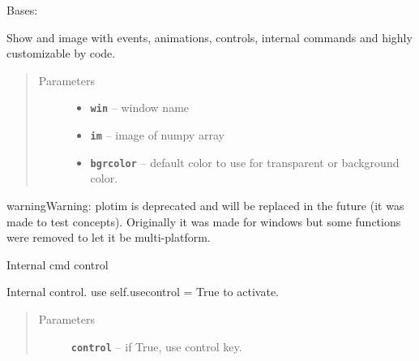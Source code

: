 \documentclass[letterpaper,10pt,english]{sphinxmanual}
\begin{document}
\begin{fulllineitems}
\label{RRtoolbox.lib:RRtoolbox.lib.plotter.plotim}
Bases: 

Show and image with events, animations, controls, internal
commands and highly customizable by code.
\begin{quote}\begin{description}
\item[{Parameters}] \leavevmode\begin{itemize}
\item {} 
\textbf{\texttt{win}} -- window name

\item {} 
\textbf{\texttt{im}} -- image of numpy array

\item {} 
\textbf{\texttt{bgrcolor}} -- default color to use for transparent or background color.

\end{itemize}

\end{description}\end{quote}

\begin{notice}{warning}{Warning:}
plotim is deprecated and will be replaced in the future (it was made to
test concepts). Originally it was made for windows but some functions
were removed to let it be multi-platform.
\end{notice}

\begin{fulllineitems}
\label{RRtoolbox.lib:RRtoolbox.lib.plotter.plotim.builtincmd}
Internal cmd control

\end{fulllineitems}


\begin{fulllineitems}
\label{RRtoolbox.lib:RRtoolbox.lib.plotter.plotim.builtincontrol}
Internal control. use self.usecontrol = True to activate.
\begin{quote}\begin{description}
\item[{Parameters}] \leavevmode
\textbf{\texttt{control}} -- if True, use control key.


\end{description}
\end{quote}
\end{fulllineitems}
\end{fulllineitems}
\end{document}
